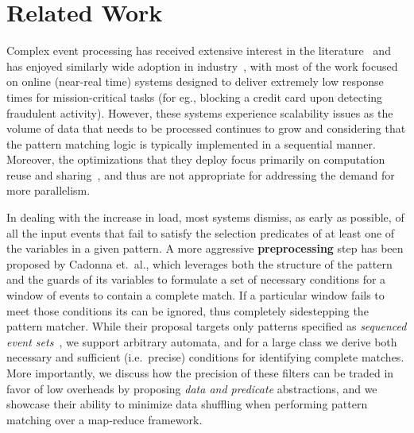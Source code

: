 \section{Related Work}
\label{sec:rel_work}

Complex event processing has received extensive interest in the 
literature~\cite{SASE:2008,SASE:2014,
	Brenna:2007,Demers:2007,Brenna:2009,	
	Cadonna:2011} and 
has enjoyed similarly wide adoption in 
industry~\cite{esper_epl,oracle_mr,aster_npath,Carasso:2012,flink_cep},
with most of the work focused on online (near-real time) systems designed to 
deliver extremely low response times for mission-critical tasks (for eg., 
blocking a credit card upon detecting fraudulent activity). 
However, 
these systems experience scalability issues 
as the volume of data that needs to be processed continues to grow
and considering that the pattern matching logic is typically implemented in a 
sequential manner.  
Moreover, the optimizations that they deploy focus primarily on computation 
reuse and sharing~\cite{Sadri:2004}, and thus are not appropriate for 
addressing the demand for more parallelism.

In dealing with the increase in load, most systems dismiss, as early as 
possible, 
of all the input events that fail to satisfy the selection predicates 
of at least one of the variables in a given pattern.
A more aggressive \textbf{preprocessing} step has been proposed by Cadonna et.\ 
al.\cite{Cadonna:2012}, which leverages both the structure of the pattern and 
the guards of its variables to formulate a set of necessary conditions for a 
window of events to contain a complete match.
If a particular window fails to meet those conditions its can be ignored, thus 
completely sidestepping the pattern matcher.
While their proposal targets only patterns specified as {\em sequenced event 
sets}~\cite{Cadonna:2011}, we support arbitrary automata, and for a large 
class we derive both necessary and sufficient (i.e.\ precise) conditions for 
identifying complete matches.
More importantly, we discuss how the precision of these filters can be traded 
in favor of low overheads by proposing {\em data and predicate} abstractions, 
and we showcase their ability to minimize data shuffling  
when performing pattern matching over a map-reduce framework.    
 

